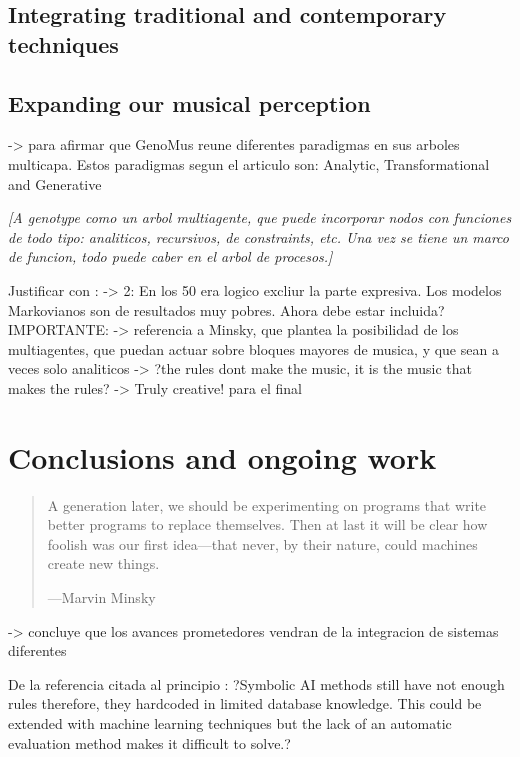 \documentclass{article}
\begin{document}
\subsection{Integrating traditional and contemporary techniques}

\subsection{Expanding our musical perception}


{\color{red}

\cite{quteprints6544} -> para afirmar que GenoMus reune diferentes paradigmas en sus arboles multicapa. Estos paradigmas segun el articulo son: Analytic, Transformational and Generative
}

{\color{gray} \textsl{[A genotype como un arbol multiagente, que puede incorporar nodos con funciones de todo tipo: analiticos, recursivos, de constraints, etc. Una vez se tiene un marco de funcion, todo puede caber en el arbol de procesos.]}}


{\color{red}

Justificar con \cite{LopezdeMantaras:2006:MMA:1565082.1565089}:
	-> 2: En los 50 era logico excliur la parte expresiva. Los modelos Markovianos son de resultados muy pobres. Ahora debe estar incluida?
IMPORTANTE:
	-> referencia a Minsky, que plantea la posibilidad de los multiagentes, que puedan actuar sobre bloques mayores de musica, y que sean a veces solo analiticos
	-> ?the rules dont make the music, it is the music that makes the rules?
	-> Truly creative! para el final
}


\section{Conclusions and ongoing work}

\begin{samepage}
\begin{quotation}
A generation later, we should be experimenting on programs
that write better programs to replace themselves. Then
at last it will be clear how foolish was our first idea---that
never, by their nature, could machines create new things.

---Marvin Minsky \cite{DBLP:journals/aim/Minsky82}
\end{quotation}
\end{samepage}

{\color{red}

\cite{Papadopoulos99aimethods} -> concluye que los avances prometedores vendran de la integracion de sistemas diferentes

De la referencia citada al principio \cite{LopezRincon2018}: ?Symbolic AI methods still have not enough rules therefore,
they hardcoded in limited database knowledge. This could be
extended with machine learning techniques but the lack of an
automatic evaluation method makes it difficult to solve.?

}
\end{document}
